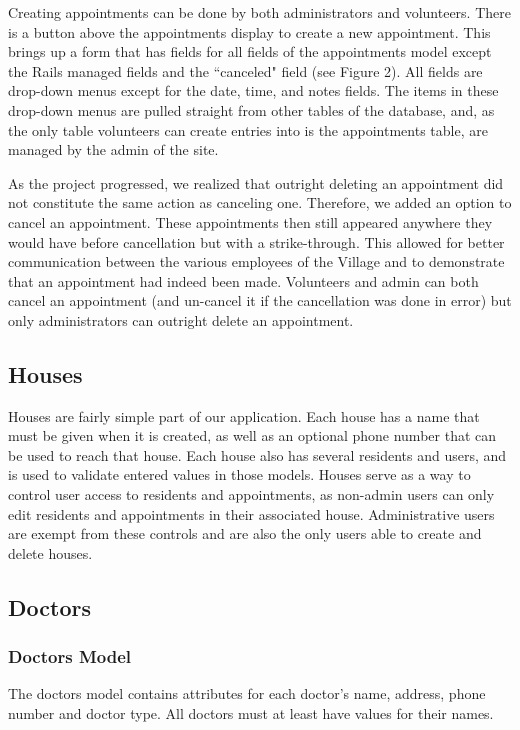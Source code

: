\documentclass{sig-alternate}
\begin{document}
Creating appointments can be done by both administrators and volunteers.  There is a button above the appointments display to create a new appointment.  This brings up a form that has fields for all fields of the appointments model except the Rails managed fields and the ``canceled" field (see Figure 2).  All fields are drop-down menus except for the date, time, and notes fields.  The items in these drop-down menus are pulled straight from other tables of the database, and, as the only table volunteers can create entries into is the appointments table, are managed by the admin of the site.

As the project progressed, we realized that outright deleting an appointment did not constitute the same action as canceling one.  Therefore, we added an option to cancel an appointment.  These appointments then still appeared anywhere they would have before cancellation but with a strike-through.  This allowed for better communication between the various employees of the Village and to demonstrate that an appointment had indeed been made.  Volunteers and admin can both cancel an appointment (and un-cancel it if the cancellation was done in error) but only administrators can outright delete an appointment.      

\subsection{Houses}
Houses are fairly simple part of our application. Each house has a name that must be given when it is created, as well as an optional phone number that can be used to reach that house. Each house also has several residents and users, and is used to validate entered values in those models. Houses serve as a way to control user access to residents and appointments, as non-admin users can only edit residents and appointments in their associated house. Administrative users are exempt from these controls and are also the only users able to create and delete houses.

\subsection{Doctors}

\subsubsection{Doctors Model}
The doctors model contains attributes for each doctor’s name, address, phone number and doctor type. All doctors must at least have values for their names. 
\end{document}
